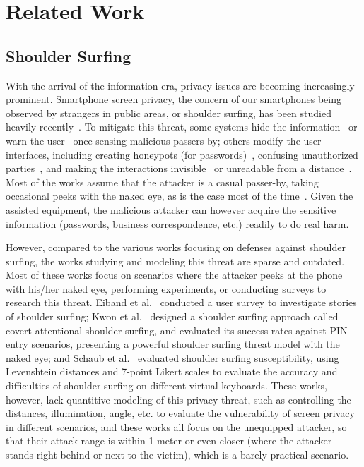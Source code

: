 \section{Related Work}
\label{sec-related-work}

\subsection{Shoulder Surfing}
With the arrival of the information era, privacy issues are becoming increasingly prominent. Smartphone screen privacy, the concern of our smartphones being observed by strangers in public areas, or shoulder surfing, has been studied heavily recently~\cite{eiband2017understanding,goucher2011look,kwon2013covert}. To mitigate this threat, some systems hide the information~\cite{brudy2014anyone} or warn the user~\cite{saad2018communicating} once sensing malicious passers-by; others modify the user interfaces, including creating honeypots (for passwords)~\cite{chakraborty2014tag}, confusing unauthorized parties~\cite{wiedenbeck2006design}, and making the interactions invisible~\cite{kumar2007reducing} or unreadable from a distance~\cite{Chun2019Keep}. Most of the works assume that the attacker is a casual passer-by, taking occasional peeks with the naked eye, as is the case most of the time~\cite{eiband2017understanding,wiedenbeck2006design}. Given the assisted equipment, the malicious attacker can however acquire the sensitive information (passwords, business correspondence, etc.) readily to do real harm.

However, compared to the various works focusing on defenses against shoulder surfing, the works studying and modeling this threat are sparse and outdated. Most of these works focus on scenarios where the attacker peeks at the phone with his/her naked eye, performing experiments, or conducting surveys to research this threat. Eiband et al.~\cite{eiband2017understanding} conducted a user survey to investigate stories of shoulder surfing; Kwon et al.~\cite{kwon2013covert} designed a shoulder surfing approach called covert attentional shoulder surfing, and evaluated its success rates against PIN entry scenarios, presenting a powerful shoulder surfing threat model with the naked eye; and Schaub et al.~\cite{schaub2012password} evaluated shoulder surfing susceptibility, using Levenshtein distances and 7-point Likert scales to evaluate the accuracy and difficulties of shoulder surfing on different virtual keyboards. These works, however, lack quantitive modeling of this privacy threat, such as controlling the distances, illumination, angle, etc. to evaluate the vulnerability of screen privacy in different scenarios, and these works all focus on the unequipped attacker, so that their attack range is within 1 meter or even closer (where the attacker stands right behind or next to the victim), which is a barely practical scenario.

